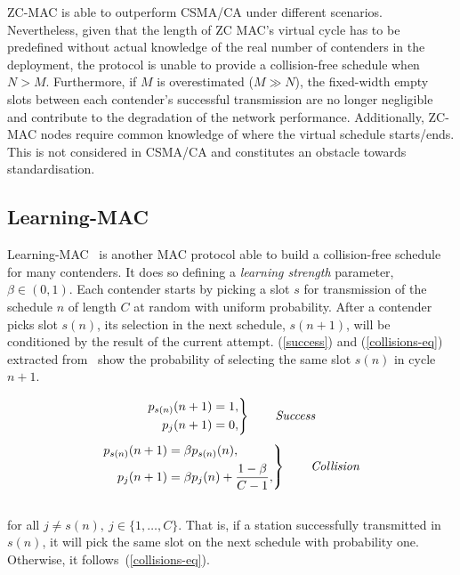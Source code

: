 ZC-MAC is able to outperform CSMA/CA under different scenarios. Nevertheless, given that the length of ZC MAC's virtual cycle has to be predefined without actual knowledge of the real number of contenders in the deployment, the protocol is unable to provide a collision-free schedule when $N>M$. Furthermore, if $M$ is overestimated ($M\gg N$), the fixed-width empty slots between each contender's successful transmission are no longer negligible and contribute to the degradation of the network performance. Additionally, ZC-MAC nodes require common knowledge of where the virtual schedule starts/ends. This is not considered in CSMA/CA and constitutes an obstacle towards standardisation.

\subsection{Learning-MAC}

Learning-MAC~\cite{L_MAC} is another MAC protocol able to build a collision-free schedule for many contenders. It does so defining a \emph{learning strength} parameter, $\beta\in(0,1)$. Each contender starts by picking a slot $s$ for transmission of the schedule $n$ of length $C$ at random with uniform probability. After a contender picks slot $s(n)$, its selection in the next schedule, $s(n+1)$, will be conditioned by the result of the current attempt. (\ref{success}) and (\ref{collisions-eq}) extracted from~\cite{L_MAC} show the probability of selecting the same slot $s(n)$ in cycle $n+1$.

\begin{equation} \label{success}
		\left. \begin{aligned}
			p_{s(n)}(n+1)&=1,\\
			p_{j}(n+1)&=0,
		\end{aligned}
	\right\}
	\qquad \text{\emph{Success}}
\end{equation}
\begin{equation} \label{collisions-eq}
	\left. \begin{aligned}
			p_{s(n)}(n+1)&=\beta p_{s(n)}(n),\\
			p_{j}(n+1)&=\beta p_{j}(n)+\frac{1-\beta}{C -1},
		\end{aligned}
	\right\}
	\qquad \text{\emph{Collision}}
\end{equation}
\\
for all $j\neq s(n),~j\in \{1,\dots ,C\}$. That is, if a station successfully transmitted in $s(n)$, it will pick the same slot on the next schedule with probability one. Otherwise, it follows~(\ref{collisions-eq}).

